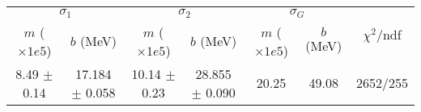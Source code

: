\begin{tabular}{cc|cc|cc||c}
\multicolumn{2}{c|}{$\sigma_1$} & \multicolumn{2}{|c}{$\sigma_2$} & \multicolumn{2}{|c}{$\sigma_G$}  & \multirow{2}{*}{$\chi^2/$ndf}\\
$m$ ($\times1e5$) & $b$ (MeV) & $m$ ($\times1e5$) & $b$ (MeV) & $m$ ($\times1e5$) & $b$ (MeV) & \\
\hline
8.49 $\pm$ 0.14 & 17.184 $\pm$ 0.058 & 10.14 $\pm$ 0.23 & 28.855 $\pm$ 0.090 & 20.25 & 49.08 & 2652/255\\
\end{tabular}
